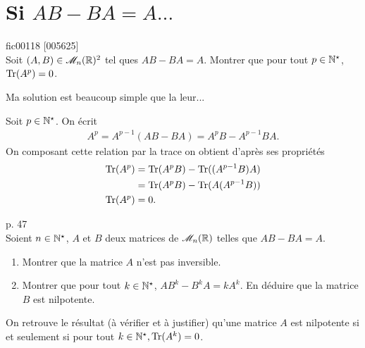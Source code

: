 \begin{solution}
\begin{enumerate}
\begin{preuve}
        \end{preuve}
    \end{enumerate}
\end{solution}


\section{Si \texorpdfstring{$AB - BA = A \dots$}{AB-BA=A...}}
\begin{exercice}
    fic00118 [005625]\\
    Soit $(A, B) \in \mathscr{M}_n(\mathbb{R})^2$ tel ques $AB-BA=A$. Montrer que pour tout $p \in \mathbb{N}^\star$, $\mathrm{Tr}(A^p) = 0$.
\end{exercice}


Ma solution est beaucoup simple que la leur...
\begin{solution}
    Soit $p \in \mathbb{N}^\star$. On écrit
    \begin{align*}
        A^p = A^{p-1}(AB-BA) = A^pB - A^{p-1}BA.
    \end{align*}
    On composant cette relation par la trace on obtient d'après ses propriétés
    \begin{align*}
        \mathrm{Tr}(A^p) &= \mathrm{Tr}(A^pB) - \mathrm{Tr}((A^{p-1}B)A) \\
        &= \mathrm{Tr}(A^pB) - \mathrm{Tr}(A(A^{p-1}B)) \\
        \mathrm{Tr}(A^p) &= 0.
    \end{align*}
\end{solution}

\begin{exercice}
    \cite{exos_oraux} p. 47 \\
    Soient $n \in \mathbb{N}^\star$, $A$ et $B$ deux matrices de $\mathscr{M}_n(\mathbb{R})$ telles que $AB - BA = A.$
    \begin{enumerate}
        \item Montrer que la matrice $A$ n'est pas inversible.
        \item Montrer que pour tout $k \in \mathbb{N}^\star$, $AB^k - B^k A = k A^k$. En déduire que la matrice $B$ est nilpotente. 
    \end{enumerate}
\end{exercice}

\begin{remarque}
    On retrouve le résultat (à vérifier et à justifier) qu'une matrice $A$ est nilpotente si et seulement si pour tout $k \in \mathbb{N}^\star, \mathrm{Tr}(A^k) = 0$.
\end{remarque}


